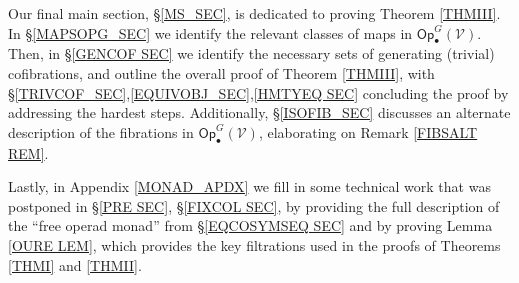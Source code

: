 \documentclass[a4paper,10pt
,draft
]{article}%
\numberwithin{equation}{section}
\numberwithin{figure}{section}
\theoremstyle{definition} %
\newtheorem{example}[equation]{Example}%
\newcommand{\Top}{\ensuremath{\mathsf{Top}}}
\newcommand{\V}{\ensuremath{\mathcal V}}
\newcommand{\1}{\ensuremath{\mathbbm 1}}%
\begin{document}
Our final main section, \S \ref{MS_SEC}, is dedicated to proving 
Theorem \ref{THMIII}.
In \S \ref{MAPSOPG_SEC} we identify the relevant classes of maps
in $\mathsf{Op}^G_{\bullet}(\V)$.
Then, in \S \ref{GENCOF SEC} we identify
the necessary sets of generating (trivial) cofibrations,
and outline the overall proof of Theorem \ref{THMIII},
with \S \ref{TRIVCOF_SEC},\ref{EQUIVOBJ_SEC},\ref{HMTYEQ SEC}
concluding the proof by addressing the hardest steps.
Additionally, \S \ref{ISOFIB_SEC} discusses an alternate description
of the fibrations in
$\mathsf{Op}^G_{\bullet}(\V)$,
elaborating on 
Remark \ref{FIBSALT REM}.




Lastly, in Appendix \ref{MONAD_APDX}
we fill in some technical work that was postponed in \S \ref{PRE SEC}, \S\ref{FIXCOL SEC},
by providing the full description of the ``free operad monad''
from \S \ref{EQCOSYMSEQ SEC}
and by proving Lemma \ref{OURE LEM},
which provides the key filtrations used in the proofs of
Theorems \ref{THMI} and \ref{THMII}.
 

\end{document}
